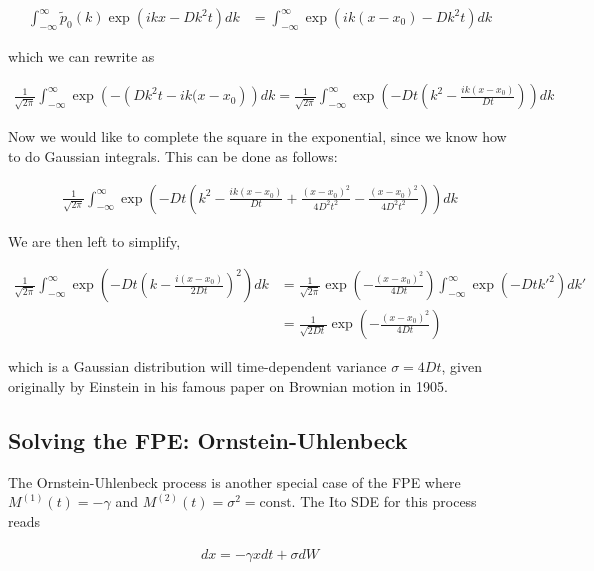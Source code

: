 \documentclass{article}
\begin{document}
\begin{align}
\int_{-\infty}^{\infty} \tilde{p}_{0}(k) \exp\left(ikx-D k^{2}t\right)dk &= \int_{-\infty}^{\infty} \exp\left(ik(x-x_{0})-D k^{2}t\right)dk
\end{align}

which we can rewrite as

\begin{align*}
\frac{1}{\sqrt{2\pi}}\int_{-\infty}^{\infty} \exp\left(-\left(D k^{2}t - ik(x-x_{0}\right)\right)dk
= \frac{1}{\sqrt{2\pi}}\int_{-\infty}^{\infty} \exp\left(-Dt\left(k^{2} - \frac{ik(x-x_{0})}{Dt}\right)\right)dk
\end{align*}

Now we would like to complete the square in the exponential, since we know how to do Gaussian integrals. This can be done as follows:

\begin{align*}
\frac{1}{\sqrt{2\pi}}\int_{-\infty}^{\infty} \exp\left(-Dt\left(k^{2} - \frac{ik(x-x_{0})}{Dt} + \frac{(x-x_{0})^{2}}{4D^{2}t^{2}} - \frac{(x-x_{0})^{2}}{4D^{2}t^{2}}\right)\right)dk
\end{align*}

We are then left to simplify,

\begin{align*}
\frac{1}{\sqrt{2\pi}}\int_{-\infty}^{\infty} \exp\left(-Dt\left(k-\frac{i(x-x_{0})}{2Dt}\right)^{2}\right)dk &= \frac{1}{\sqrt{2\pi}}\exp\left(- \frac{(x-x_{0})^{2}}{4Dt}\right)\int_{-\infty}^{\infty} \exp\left(-Dtk'^{2}\right)dk'\\
&= \frac{1}{\sqrt{2Dt}}\exp\left(- \frac{(x-x_{0})^{2}}{4Dt}\right)
\end{align*}

which is a Gaussian distribution will time-dependent variance $\sigma=4Dt$, given originally by Einstein in his famous paper on Brownian motion in 1905. 

\subsection{Solving the FPE: Ornstein-Uhlenbeck}

The Ornstein-Uhlenbeck process is another special case of the FPE where $M^{(1)}(t) = -\gamma$ and $M^{(2)}(t) = \sigma^{2} = \mathrm{const}$. The Ito SDE for this process reads

\begin{align}
dx = -\gamma xdt + \sigma dW
\end{align}
\end{document}
